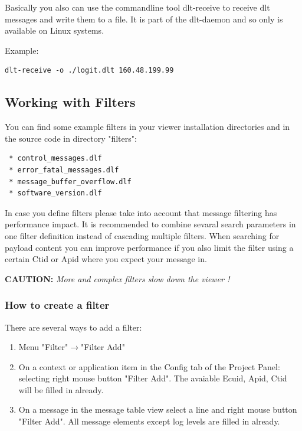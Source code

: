 \documentclass[a4paper,11pt]{article}
\newcommand{\caution}[1]{\begin{ibox} \textbf{CAUTION:} \emph{#1} \end{ibox}}
\begin{document}
Basically you also can use the commandline tool dlt-receive to receive dlt messages and write them to a file.
It is part of the dlt-daemon and so only is available on Linux systems.

Example:

\begin{verbatim}
dlt-receive -o ./logit.dlt 160.48.199.99
\end{verbatim}



\pagebreak

\subsection{Working with Filters}
\label{workingwithfilters}
You can find some example filters in your viewer installation directories and in the source code in directory "filters":
\begin{verbatim}
 * control_messages.dlf
 * error_fatal_messages.dlf
 * message_buffer_overflow.dlf
 * software_version.dlf
\end{verbatim}

In case you define filters please take into account that message filtering has performance impact. It is recommended to combine sevaral search parameters in one filter definition instead of cascading multiple filters.
When searching for payload content you can improve performance if you also limit the filter using a certain Ctid or Apid where you expect your message in.



\caution{More and complex filters slow down the viewer !}


\subsubsection{How to create a filter}

There are several ways to add a filter:
\begin{enumerate}
\item Menu "Filter"\ensuremath{\rightarrow}"Filter Add"
\item On a context or application item in the Config tab of the Project Panel: selecting right mouse button "Filter Add".
The avaiable Ecuid, Apid, Ctid will be filled in already.
\item On a message in the message table view select a line and right mouse button "Filter Add". All message elements except log levels are filled in already.
\end{enumerate}
\end{document}
